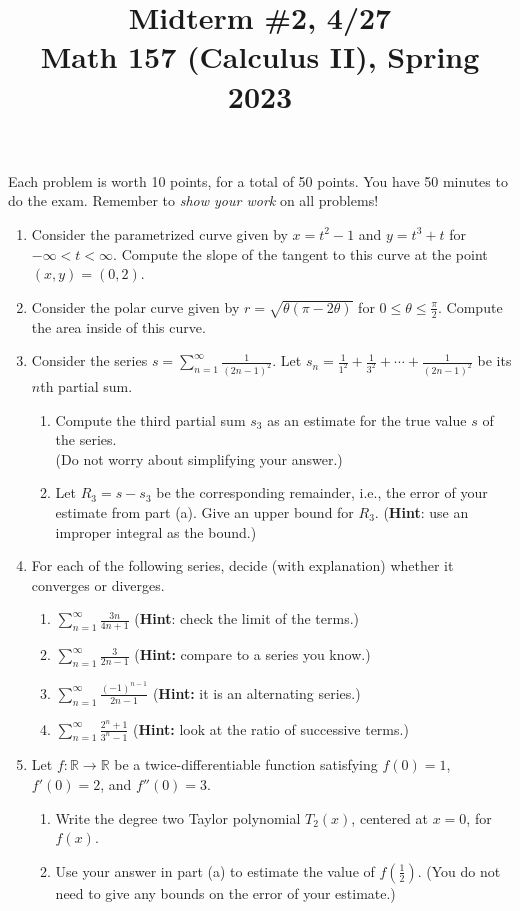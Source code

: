 \documentclass[11pt]{article}
\title{Midterm \#2, 4/27 \\ Math 157 (Calculus II), Spring 2023}
\date{}
\begin{document}
\maketitle

\thispagestyle{empty}

\vspace{-1cm}

Each problem is worth 10 points, for a total of 50 points. You have 50 minutes to do the exam. Remember to \emph{show your work} on all problems!

\begin{enumerate}
\item Consider the parametrized curve given by $x=t^2-1$ and $y=t^3+t$ for $-\infty < t < \infty$. Compute the slope of the tangent to this curve at the point $(x,y)=(0,2)$.
\item Consider the polar curve given by $r=\sqrt{\theta (\pi-2\theta)}$ for $0 \leq \theta \leq \frac{\pi}{2}$. Compute the area inside of this curve.
\item Consider the series $s=\displaystyle \sum_{n=1}^{\infty} \frac{1}{(2n-1)^2}$. Let $s_n = \frac{1}{1^2} + \frac{1}{3^2} + \cdots + \frac{1}{(2n-1)^2}$ be its $n$th partial sum.
\begin{enumerate}
\item Compute the third partial sum $s_3$ as an estimate for the true value $s$ of the series. \\ (Do not worry about simplifying your answer.)
\item Let $R_3 = s - s_3$ be the corresponding remainder, i.e., the error of your estimate from part (a). Give an upper bound for $R_3$. ({\bf Hint}: use an improper integral as the bound.)
\end{enumerate}
\item For each of the following series, decide (with explanation) whether it converges or diverges.
\begin{enumerate}
\item $\displaystyle \sum_{n=1}^{\infty} \frac{3n}{4n+1}$ \hfill ({\bf Hint}: check the limit of the terms.)
\item $\displaystyle \sum_{n=1}^{\infty} \frac{3}{2n-1}$ \hfill ({\bf Hint:} compare to a series you know.)
\item $\displaystyle \sum_{n=1}^{\infty} \frac{(-1)^{n-1}}{2n-1}$ \hfill ({\bf Hint:} it is an alternating series.)
\item $\displaystyle \sum_{n=1}^{\infty} \frac{2^n+1}{3^n-1}$ \hfill ({\bf Hint:} look at the ratio of successive terms.)
\end{enumerate}

\item Let $f\colon \mathbb{R}\to \mathbb{R}$ be a twice-differentiable function satisfying $f(0) = 1$, $f'(0) = 2$, and $f''(0)=3$.
\begin{enumerate}
\item Write the degree two Taylor polynomial $T_2(x)$, centered at $x=0$, for $f(x)$.
\item Use your answer in part (a) to estimate the value of $f(\frac{1}{2})$. (You do not need to give any bounds on the error of your estimate.)
\end{enumerate}
\end{enumerate}
\end{document}

